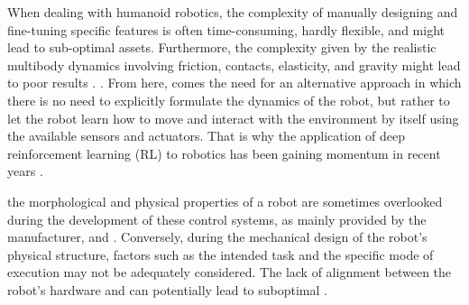 When dealing with humanoid robotics, the complexity of manually designing and fine-tuning specific features is often time-consuming, hardly flexible, and might lead to sub-optimal assets. Furthermore,  the complexity given by the realistic multibody dynamics involving friction, contacts, elasticity, and gravity  might lead to poor results . . From here, comes the need for an alternative approach in which there is no need to explicitly formulate the dynamics of the robot, but rather to let the robot learn how to move and interact with the environment by itself using the available sensors and actuators. That is why the application of deep reinforcement learning (\ac{RL}) to robotics has been gaining momentum in recent years \citep{golroudbari_recent_2023,li_reinforcement_2021}.

the morphological and physical properties of a robot are sometimes overlooked during the development of these control systems, as mainly provided by the manufacturer, and  . Conversely, during the mechanical design of the robot's physical structure, factors such as the intended task and the specific mode of execution may not be adequately considered. The lack of alignment between the robot's hardware and  can potentially lead to suboptimal  . 

